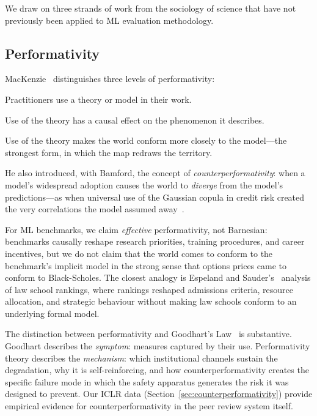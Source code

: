 \documentclass{article}
\begin{document}
We draw on three strands of work from the sociology of science that have not previously been applied to ML evaluation methodology.

\subsection{Performativity}

MacKenzie~\citep{mackenzie_engine_2006} distinguishes three levels of performativity:

\begin{description}[leftmargin=1.5cm]
\item[Generic] Practitioners use a theory or model in their work.
\item[Effective] Use of the theory has a causal effect on the phenomenon it describes.
\item[Barnesian] Use of the theory makes the world conform more closely to the model---the strongest form, in which the map redraws the territory.
\end{description}

He also introduced, with Bamford, the concept of \textit{counterperformativity}: when a model's widespread adoption causes the world to \emph{diverge} from the model's predictions---as when universal use of the Gaussian copula in credit risk created the very correlations the model assumed away~\citep{mackenzie_bamford_2018}.

For ML benchmarks, we claim \textit{effective} performativity, not Barnesian: benchmarks causally reshape research priorities, training procedures, and career incentives, but we do not claim that the world comes to conform to the benchmark's implicit model in the strong sense that options prices came to conform to Black-Scholes. The closest analogy is Espeland and Sauder's~\citep{espeland_sauder_2007} analysis of law school rankings, where rankings reshaped admissions criteria, resource allocation, and strategic behaviour without making law schools conform to an underlying formal model.

The distinction between performativity and Goodhart's Law~\citep{goodhart_1975} is substantive. Goodhart describes the \textit{symptom}: measures captured by their use. Performativity theory describes the \textit{mechanism}: which institutional channels sustain the degradation, why it is self-reinforcing, and how counterperformativity creates the specific failure mode in which the safety apparatus generates the risk it was designed to prevent. Our ICLR data (Section~\ref{sec:counterperformativity}) provide empirical evidence for counterperformativity in the peer review system itself.
\end{document}
